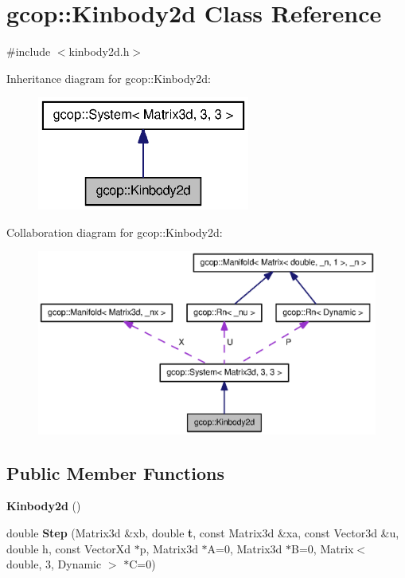 \section{gcop\-:\-:\-Kinbody2d \-Class \-Reference}
\label{classgcop_1_1Kinbody2d}


{\ttfamily \#include $<$kinbody2d.\-h$>$}



\-Inheritance diagram for gcop\-:\-:\-Kinbody2d\-:
\nopagebreak
\begin{figure}[H]
\begin{center}
\leavevmode
\includegraphics[width=198pt]{classgcop_1_1Kinbody2d__inherit__graph}
\end{center}
\end{figure}


\-Collaboration diagram for gcop\-:\-:\-Kinbody2d\-:
\nopagebreak
\begin{figure}[H]
\begin{center}
\leavevmode
\includegraphics[width=350pt]{classgcop_1_1Kinbody2d__coll__graph}
\end{center}
\end{figure}
\subsection*{\-Public \-Member \-Functions}
\begin{DoxyCompactItemize}
\item 
{\bf \-Kinbody2d} ()
\item 
double {\bf \-Step} (\-Matrix3d \&xb, double {\bf t}, const \-Matrix3d \&xa, const \-Vector3d \&u, double h, const \-Vector\-Xd $\ast$p, \-Matrix3d $\ast$\-A=0, \-Matrix3d $\ast$\-B=0, \-Matrix$<$ double, 3, \-Dynamic $>$ $\ast$\-C=0)
\end{DoxyCompactItemize}
